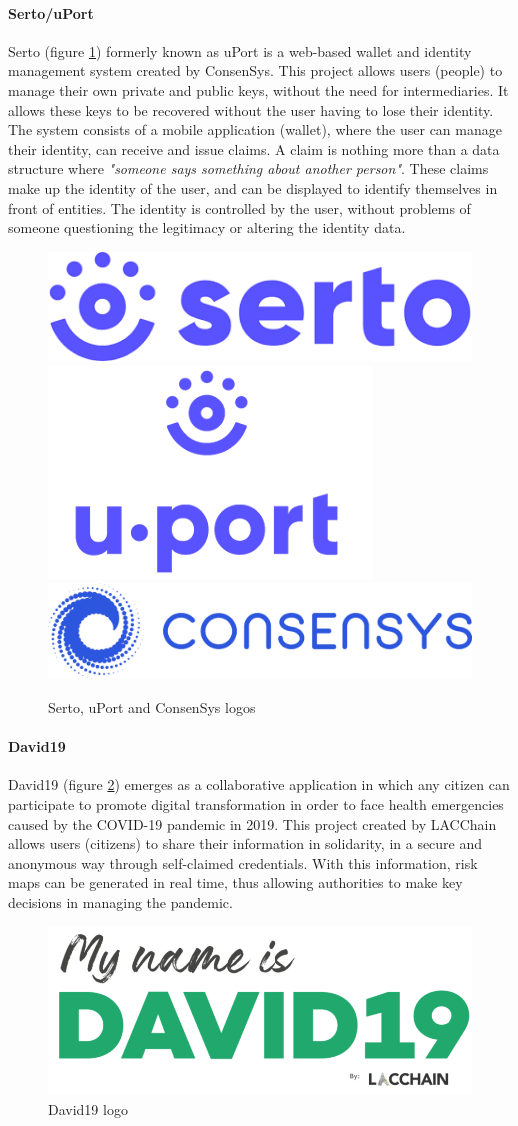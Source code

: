 \paragraph{Serto/uPort}
Serto\cite{serto} (figure \ref{fig:uport}) formerly known as uPort\cite{uport} is a web-based wallet and identity management system created by ConsenSys\cite{consenSys}. This project allows users (people) to manage their own private and public keys, without the need for intermediaries. It allows these keys to be recovered without the user having to lose their identity. The system consists of a mobile application (wallet), where the user can manage their identity, can receive and issue claims. A claim is nothing more than a data structure where \textit{"someone says something about another person"}. These claims make up the identity of the user, and can be displayed to identify themselves in front of entities. The identity is controlled by the user, without problems of someone questioning the legitimacy or altering the identity data.
\begin{figure}[h]
    \centering
    \includegraphics[width=.2\textwidth]{images/State of the Art/ssi/serto-logo.png}\hfill
    \includegraphics[width=.2\textwidth]{images/State of the Art/ssi/uport-logo.png}\hfill
    \includegraphics[width=.3\textwidth]{images/State of the Art/ssi/consensys-horizontal-logo.png}
    \caption{Serto, uPort and ConsenSys logos}
    \label{fig:uport}
\end{figure}

\paragraph{David19}
David19\cite{david19} (figure \ref{fig:david19}) emerges as a collaborative application in which any citizen can participate to promote digital transformation in order to face health emergencies caused by the COVID-19 pandemic in 2019. This project created by LACChain\cite{lacchain} allows users (citizens) to share their information in solidarity, in a secure and anonymous way through self-claimed credentials. With this information, risk maps can be generated in real time, thus allowing authorities to make key decisions in managing the pandemic.\\
\begin{figure}[h]
    \centering
    \includegraphics[width=.3\textwidth]{images/State of the Art/ssi/logo-david19.png}
    \caption{David19 logo}
    \label{fig:david19}
\end{figure}

